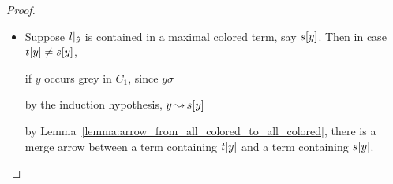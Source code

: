 \documentclass[,%
	paper=a4,%
	DIV11, %
	twoside=false,%
	liststotoc,
	bibtotoc,
	draft=false,%
	numbers=noendperiod
]{scrartcl}
\begin{document}
{\begin{proof}
\begin{description}
\begin{itemize}
						Then by the induction hypothesis, there is an path from a term containing some grey occurrence of $y$ to a term containing $y$ in $t$.
						After applying $\sigma$, the path leads from $y\sigma\occ{x}$ to~$t\sigma\occ{x}$.
						If $y\sigma\occ{x}$ has a grey occurrence of $x$, we are done.
						Otherwise it has a colored occurrence of $x$.
						But as $l\at{\bhat y}\sigma = l'\at{\bhat y}\sigma$, there is a colored occurrence of $x$ in $C_2$. 
						If there also is a grey occurrence, then by the induction hypothesis, there is an arrow from some grey occurrence of $x$ to $l'\at{\bhat y}$ and hence there is a path from that grey occurrence to $t\sigma\occ{x}$.
						If there is no grey occurrence of $x$ in $C_2$, suppose that $x$ originates from $C_1$ and there is a grey occurrence of $x$ in $C_1$, as otherwise we are done.
						As $l'\at{\bhat y}\sigma$ contains $x$ but $l\at{\bhat y}\sigma$, $x$ must occur in $l$, say at $\bdot x$ and its corresponding term in $l'$ is a variable, say $z$, such that $z\sigma = x$.
						$z$ also occurs in $l'\at{\bhat y}\sigma$.
						\begin{itemize}
							\item
								Suppose $l\at{\bdot x}$ is a grey occurrence. Then $l'\at{\bdot x}$ is so as well and by the induction hypothesis, there is a path from a term containing a grey occurrence of $z$ in $C_1$ to $l'\at{\bhat y}\sigma$ and we are done.
							\item
								Otherwise $l\at{\bdot x}$ is a colored occurrence.
								Then so is $l'\at{\bdot x}$ and by Lemma~\ref{lemma:arrow_from_all_colored_to_all_colored}, there is a merge edge between a term containing $l'\at{\bdot x}$ and a term containing $l'\at{\bhat y}\sigma$.
								As there is a grey occurrence of $x$ in $C_1$, by the induction hypothesis, there is a path from a term containing a grey occurrence of $x$ to $l'\at{\bdot x}$ and we are done.
						\end{itemize}



					\item Suppose $l|_{\bm\hat y}$ is contained in a maximal colored term, say $s[y]$.
						\cbstart
					Then in case $t\occ{y} \neq\nolinebreak s\occ{y}$,

					if $y$ occurs grey in $C_1$, since $y\sigma$ 

					by the induction hypothesis, $y\operatorname{\leadsto} s[y]$


					by Lemma~\ref{lemma:arrow_from_all_colored_to_all_colored},
					there is a merge arrow between a term containing $t[y]$ and a term containing $s[y]$.
					\cbend


\end{itemize}
\end{description}
\end{proof}}
\end{document}
